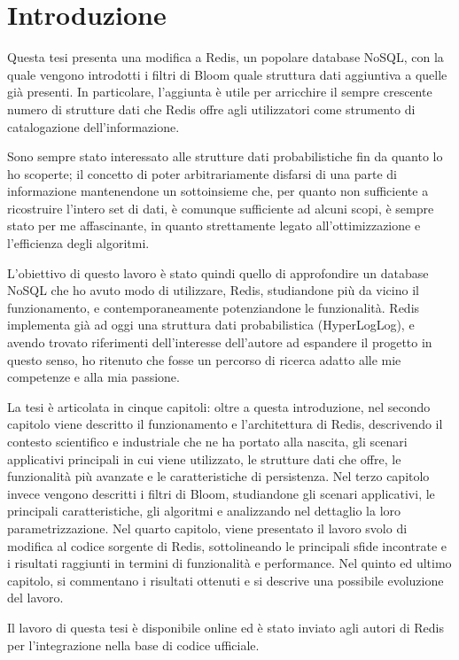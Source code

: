 \chapter{Introduzione}

Questa tesi presenta una modifica a Redis, un popolare database NoSQL, con la quale vengono
introdotti i filtri di Bloom quale struttura dati aggiuntiva a quelle già presenti. In particolare,
l'aggiunta è utile per arricchire il sempre crescente numero di strutture dati che Redis offre agli
utilizzatori come strumento di catalogazione dell'informazione.

Sono sempre stato interessato alle strutture dati probabilistiche fin da quanto lo ho scoperte; il
concetto di poter arbitrariamente disfarsi di una parte di informazione mantenendone un sottoinsieme
che, per quanto non sufficiente a ricostruire l'intero set di dati, è comunque sufficiente ad alcuni
scopi, è sempre stato per me affascinante, in quanto strettamente legato all'ottimizzazione e
l'efficienza degli algoritmi.

L'obiettivo di questo lavoro è stato quindi quello di approfondire un database NoSQL che ho avuto
modo di utilizzare, Redis, studiandone più da vicino il funzionamento, e contemporaneamente
potenziandone le funzionalità. Redis implementa già ad oggi una struttura dati probabilistica
(HyperLogLog), e avendo trovato riferimenti dell'interesse dell'autore ad espandere il progetto in
questo senso, ho ritenuto che fosse un percorso di ricerca adatto alle mie competenze e alla mia
passione.

La tesi è articolata in cinque capitoli: oltre a questa introduzione, nel secondo capitolo viene
descritto il funzionamento e l'architettura di Redis, descrivendo il contesto scientifico e
industriale che ne ha portato alla nascita, gli scenari applicativi principali in cui viene
utilizzato, le strutture dati che offre, le funzionalità più avanzate e le caratteristiche di
persistenza. Nel terzo capitolo invece vengono descritti i filtri di Bloom, studiandone gli scenari
applicativi, le principali caratteristiche, gli algoritmi e analizzando nel dettaglio la loro
parametrizzazione. Nel quarto capitolo, viene presentato il lavoro svolo di modifica al codice
sorgente di Redis, sottolineando le principali sfide incontrate e i risultati raggiunti in termini
di funzionalità e performance. Nel quinto ed ultimo capitolo, si commentano i risultati ottenuti e
si descrive una possibile evoluzione del lavoro.

Il lavoro di questa tesi è disponibile online ed è stato inviato agli autori di Redis per
l'integrazione nella base di codice ufficiale.
